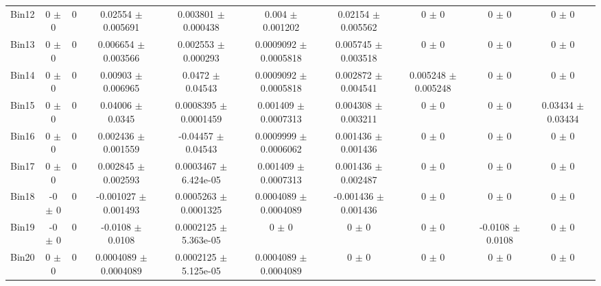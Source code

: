 \begin{tabular}{@{\extracolsep{4pt}}lccccccccc@{}}
     Bin12 & 0 $\pm$ 0 & 0 & 0.02554 $\pm$ 0.005691 & 0.003801 $\pm$ 0.000438 & 0.004 $\pm$ 0.001202 & 0.02154 $\pm$ 0.005562 & 0 $\pm$ 0 & 0 $\pm$ 0 & 0 $\pm$ 0 \\ 
     Bin13 & 0 $\pm$ 0 & 0 & 0.006654 $\pm$ 0.003566 & 0.002553 $\pm$ 0.000293 & 0.0009092 $\pm$ 0.0005818 & 0.005745 $\pm$ 0.003518 & 0 $\pm$ 0 & 0 $\pm$ 0 & 0 $\pm$ 0 \\ 
     Bin14 & 0 $\pm$ 0 & 0 & 0.00903 $\pm$ 0.006965 & 0.0472 $\pm$ 0.04543 & 0.0009092 $\pm$ 0.0005818 & 0.002872 $\pm$ 0.004541 & 0.005248 $\pm$ 0.005248 & 0 $\pm$ 0 & 0 $\pm$ 0 \\ 
     Bin15 & 0 $\pm$ 0 & 0 & 0.04006 $\pm$ 0.0345 & 0.0008395 $\pm$ 0.0001459 & 0.001409 $\pm$ 0.0007313 & 0.004308 $\pm$ 0.003211 & 0 $\pm$ 0 & 0 $\pm$ 0 & 0.03434 $\pm$ 0.03434 \\ 
     Bin16 & 0 $\pm$ 0 & 0 & 0.002436 $\pm$ 0.001559 & -0.04457 $\pm$ 0.04543 & 0.0009999 $\pm$ 0.0006062 & 0.001436 $\pm$ 0.001436 & 0 $\pm$ 0 & 0 $\pm$ 0 & 0 $\pm$ 0 \\ 
     Bin17 & 0 $\pm$ 0 & 0 & 0.002845 $\pm$ 0.002593 & 0.0003467 $\pm$ 6.424e-05 & 0.001409 $\pm$ 0.0007313 & 0.001436 $\pm$ 0.002487 & 0 $\pm$ 0 & 0 $\pm$ 0 & 0 $\pm$ 0 \\ 
     Bin18 & -0 $\pm$ 0 & 0 & -0.001027 $\pm$ 0.001493 & 0.0005263 $\pm$ 0.0001325 & 0.0004089 $\pm$ 0.0004089 & -0.001436 $\pm$ 0.001436 & 0 $\pm$ 0 & 0 $\pm$ 0 & 0 $\pm$ 0 \\ 
     Bin19 & -0 $\pm$ 0 & 0 & -0.0108 $\pm$ 0.0108 & 0.0002125 $\pm$ 5.363e-05 & 0 $\pm$ 0 & 0 $\pm$ 0 & 0 $\pm$ 0 & -0.0108 $\pm$ 0.0108 & 0 $\pm$ 0 \\ 
     Bin20 & 0 $\pm$ 0 & 0 & 0.0004089 $\pm$ 0.0004089 & 0.0002125 $\pm$ 5.125e-05 & 0.0004089 $\pm$ 0.0004089 & 0 $\pm$ 0 & 0 $\pm$ 0 & 0 $\pm$ 0 & 0 $\pm$ 0 \\ 
\hline\hline
  \end{tabular}
